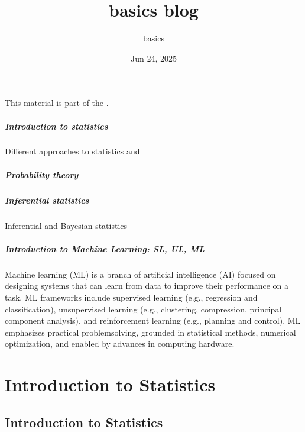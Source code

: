 \documentclass[letterpaper,10pt,english]{jupyterBook}
\title{basics blog}
\date{Jun 24, 2025}
\author{basics}
\begin{document}
\pagestyle{empty}
\sphinxmaketitle
\pagestyle{plain}
\sphinxtableofcontents
\pagestyle{normal}
\label{\detokenize{intro::doc}}


\sphinxAtStartPar
This material is part of the .

\sphinxAtStartPar
{}
\subsubsection*{Introduction to statistics}

\sphinxAtStartPar
Different approaches to statistics and 
\subsubsection*{Probability theory}
\subsubsection*{Inferential statistics}

\sphinxAtStartPar
Inferential and Bayesian statistics
\subsubsection*{Introduction to Machine Learning: SL, UL, ML}

\sphinxAtStartPar
Machine learning (ML) is a branch of artificial intelligence (AI) focused on designing systems that can learn from data to improve their performance on a task. ML frameworks include supervised learning (e.g., regression and classification), unsupervised learning (e.g., clustering, compression, principal component analysis), and reinforcement learning (e.g., planning and control). ML emphasizes practical problem\sphinxhyphen{}solving, grounded in statistical methods, numerical optimization, and enabled by advances in computing hardware.





\sphinxstepscope


\part{Introduction to Statistics}

\sphinxstepscope


\chapter{Introduction to Statistics}
\label{\detokenize{ch/intro/intro:introduction-to-statistics}}\label{\detokenize{ch/intro/intro:intro}}\label{\detokenize{ch/intro/intro::doc}}
\sphinxstepscope
\end{document}
